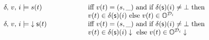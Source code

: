 \begin{figure}
	\[
		\begin{array}{@{}ll@{\;\;}@{\;\;}ll@{}}
			\delta,\,v,\,i \models s(t)                                   & \text{iff } v(t)=(s,\_) \text{ and if } \delta(\p{s})(i) \neq \bot \text{ then }                                                   \\ & v(t)\in\delta(\p{s})(i) \text{ else } v(t)\in \mathbb{O}^{\mathcal{D}_i}                     &  & \\
			\delta,\,v,\,i \models \mfodlcl{s}(t)\qquad\qquad\quad        & \text{iff } v(t)=(s,\_) \text{ and if } \delta(\p{s})(i) \neq \bot \text{ then }                                                   \\ & v(t)\in\delta(\p{s})(i)\downarrow \text{ else } v(t)\in \mathbb{O}^{\mathcal{D}_i}\downarrow &  & \\


\end{array}\]
\end{figure}
